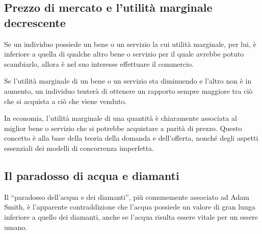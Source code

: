 % 

\subsection{Prezzo di mercato e l'utilità marginale decrescente}

Se un individuo possiede un bene o un servizio la cui utilità marginale, per 
lui, è inferiore a quella di qualche altro bene o servizio per il quale avrebbe 
potuto scambiarlo, allora è nel suo interesse effettuare il commercio. 

Se l'utilità marginale di un bene o un servizio sta diminuendo e l'altro non è 
in aumento, un individuo tenterà di ottenere un rapporto sempre maggiore tra 
ciò che si acquista a ciò che viene venduto.

In economia, l'utilità marginale di una quantità è chiaramente associata al 
miglior bene o servizio che si potrebbe acquistare a parità di prezzo.
Questo concetto è alla base della teoria della domanda e 
dell'offerta, nonché degli aspetti essenziali dei modelli di concorrenza 
imperfetta.

\subsection{Il paradosso di acqua e diamanti}

Il ``paradosso dell'acqua e dei diamanti'', più comunemente associato ad 
Adam Smith,
è l'apparente contraddizione che l'acqua possiede un valore di gran lunga 
inferiore a quello dei diamanti, anche se l'acqua risulta essere vitale per un 
essere umano.


